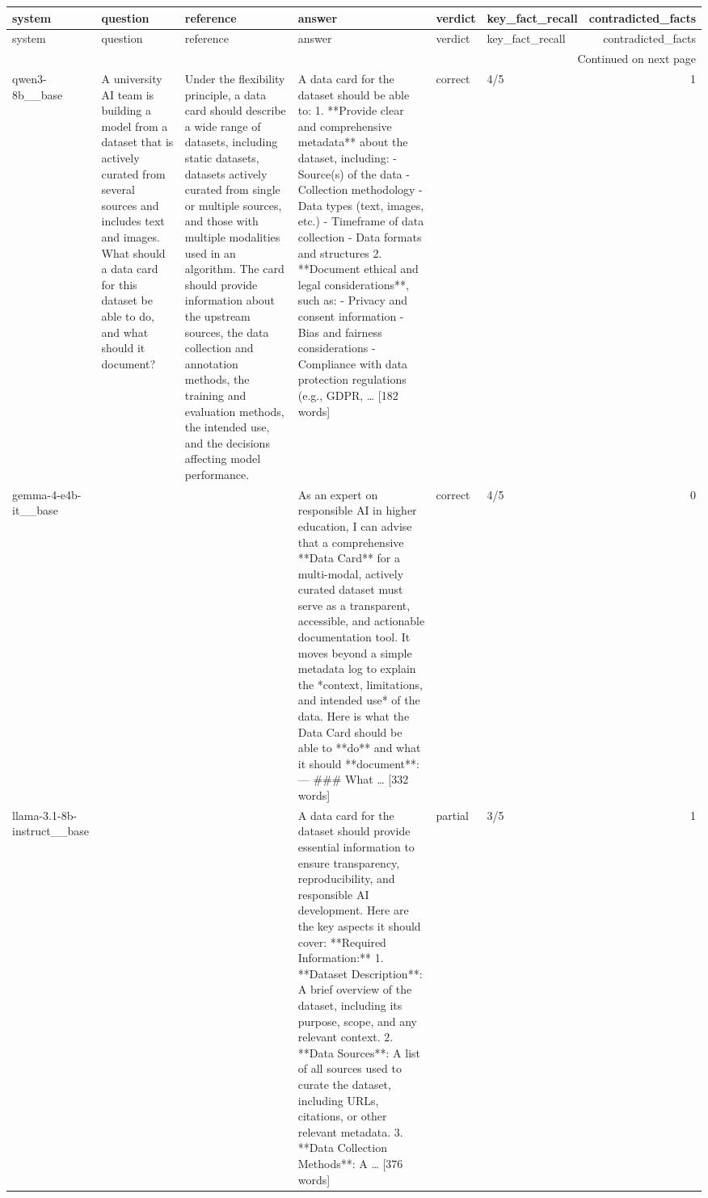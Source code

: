 \begin{longtable}{llllllr}
\toprule
system & question & reference & answer & verdict & key\_fact\_recall & contradicted\_facts \\
\midrule
\endfirsthead
\toprule
system & question & reference & answer & verdict & key\_fact\_recall & contradicted\_facts \\
\midrule
\endhead
\midrule
\multicolumn{7}{r}{Continued on next page} \\
\midrule
\endfoot
\bottomrule
\endlastfoot
qwen3-8b\_\_base & A university AI team is building a model from a dataset that is actively curated from several sources and includes text and images. What should a data card for this dataset be able to do, and what should it document? & Under the flexibility principle, a data card should describe a wide range of datasets, including static datasets, datasets actively curated from single or multiple sources, and those with multiple modalities used in an algorithm. The card should provide information about the upstream sources, the data collection and annotation methods, the training and evaluation methods, the intended use, and the decisions affecting model performance. & A data card for the dataset should be able to: 1. **Provide clear and comprehensive metadata** about the dataset, including: - Source(s) of the data - Collection methodology - Data types (text, images, etc.) - Timeframe of data collection - Data formats and structures 2. **Document ethical and legal considerations**, such as: - Privacy and consent information - Bias and fairness considerations - Compliance with data protection regulations (e.g., GDPR, … [182 words] & correct & 4/5 & 1 \\
gemma-4-e4b-it\_\_base &  &  & As an expert on responsible AI in higher education, I can advise that a comprehensive **Data Card** for a multi-modal, actively curated dataset must serve as a transparent, accessible, and actionable documentation tool. It moves beyond a simple metadata log to explain the *context, limitations, and intended use* of the data. Here is what the Data Card should be able to **do** and what it should **document**: --- \#\#\# What … [332 words] & correct & 4/5 & 0 \\
llama-3.1-8b-instruct\_\_base &  &  & A data card for the dataset should provide essential information to ensure transparency, reproducibility, and responsible AI development. Here are the key aspects it should cover: **Required Information:** 1. **Dataset Description**: A brief overview of the dataset, including its purpose, scope, and any relevant context. 2. **Data Sources**: A list of all sources used to curate the dataset, including URLs, citations, or other relevant metadata. 3. **Data Collection Methods**: A … [376 words] & partial & 3/5 & 1 \\

\end{longtable}
